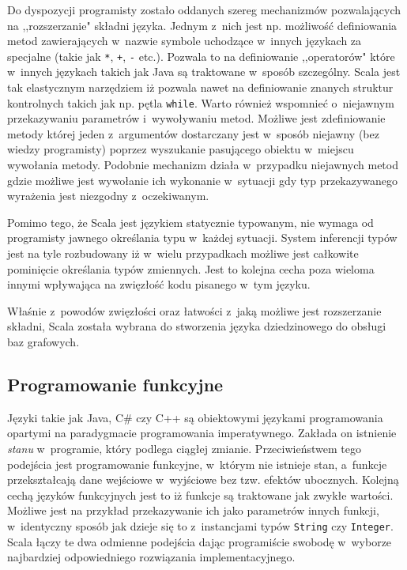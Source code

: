 \documentclass[brudnopis]{xmgr}
\begin{document}
Do dyspozycji programisty zostało oddanych szereg mechanizmów pozwalających na ,,rozszerzanie" składni języka. Jednym z~nich jest np. możliwość definiowania metod zawierających w~nazwie symbole uchodzące w~innych językach za specjalne (takie jak \texttt{*}, \texttt{+}, \texttt{-} etc.). Pozwala to na definiowanie ,,operatorów" które w~innych językach takich jak Java są traktowane w~sposób szczególny. Scala jest tak elastycznym narzędziem iż pozwala nawet na definiowanie znanych struktur kontrolnych takich jak np. pętla \texttt{while}. Warto również wspomnieć o~niejawnym przekazywaniu parametrów i~wywoływaniu metod. Możliwe jest zdefiniowanie metody której jeden z~argumentów dostarczany jest w~sposób niejawny (bez wiedzy programisty) poprzez wyszukanie pasującego obiektu w~miejscu wywołania metody. Podobnie mechanizm działa w~przypadku niejawnych metod gdzie możliwe jest wywołanie ich wykonanie w~sytuacji gdy typ przekazywanego wyrażenia jest niezgodny z~oczekiwanym.

Pomimo tego, że Scala jest językiem statycznie typowanym, nie wymaga od programisty jawnego określania typu w~każdej sytuacji. System inferencji typów jest na tyle rozbudowany iż w~wielu przypadkach możliwe jest całkowite pominięcie określania typów zmiennych. Jest to kolejna cecha poza wieloma innymi wpływająca na zwięzłość kodu pisanego w~tym języku.

Właśnie z~powodów zwięzłości oraz łatwości z~jaką możliwe jest rozszerzanie składni, Scala została wybrana do stworzenia języka dziedzinowego do obsługi baz grafowych.

\subsection{Programowanie funkcyjne}

Języki takie jak Java, C\# czy C++ są obiektowymi językami programowania opartymi na paradygmacie programowania imperatywnego. Zakłada on istnienie \textit{stanu} w~programie, który podlega ciągłej zmianie. Przeciwieństwem tego podejścia jest programowanie funkcyjne, w~którym nie istnieje stan, a~funkcje przekształcają dane wejściowe w~wyjściowe bez tzw. efektów ubocznych. Kolejną cechą języków funkcyjnych jest to iż funkcje są traktowane jak zwykłe wartości. Możliwe jest na przykład przekazywanie ich jako parametrów innych funkcji, w~identyczny sposób jak dzieje się to z~instancjami typów \texttt{String} czy \texttt{Integer}. Scala łączy te dwa odmienne podejścia dając programiście swobodę w~wyborze najbardziej odpowiedniego rozwiązania implementacyjnego.
\end{document}
